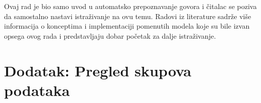 \documentclass[a4paper]{article}
\begin{document}
Ovaj rad je bio samo uvod u automatsko prepoznavanje govora i čitalac se poziva da samostalno nastavi istraživanje na ovu temu.
Radovi iz literature sadrže više informacija o konceptima i implementaciji pomenutih modela koje su bile izvan opsega ovog rada i predstavljaju dobar početak za dalje istraživanje.


\appendix
 
% 


\appendix

\section{Dodatak: Pregled skupova podataka}
\label{sec:skupovi}
\end{document}
